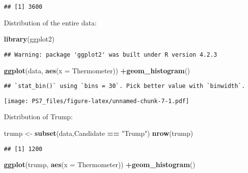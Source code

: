 \documentclass[
]{article}
\newenvironment{Shaded}{\begin{snugshade}}{\end{snugshade}}
\newcommand{\AttributeTok}[1]{\textcolor[rgb]{0.13,0.29,0.53}{#1}}
\newcommand{\FunctionTok}[1]{\textcolor[rgb]{0.13,0.29,0.53}{\textbf{#1}}}
\newcommand{\NormalTok}[1]{#1}
\newcommand{\OtherTok}[1]{\textcolor[rgb]{0.56,0.35,0.01}{#1}}
\newcommand{\SpecialCharTok}[1]{\textcolor[rgb]{0.81,0.36,0.00}{\textbf{#1}}}
\newcommand{\StringTok}[1]{\textcolor[rgb]{0.31,0.60,0.02}{#1}}
\begin{document}
\begin{verbatim}
## [1] 3600
\end{verbatim}

Distribution of the entire data:

\begin{Shaded}
\begin{Highlighting}[]
\FunctionTok{library}\NormalTok{(ggplot2)}
\end{Highlighting}
\end{Shaded}

\begin{verbatim}
## Warning: package 'ggplot2' was built under R version 4.2.3
\end{verbatim}

\begin{Shaded}
\begin{Highlighting}[]
\FunctionTok{ggplot}\NormalTok{(data, }\FunctionTok{aes}\NormalTok{(}\AttributeTok{x =}\NormalTok{ Thermometer)) }\SpecialCharTok{+}\FunctionTok{geom\_histogram}\NormalTok{()}
\end{Highlighting}
\end{Shaded}

\begin{verbatim}
## `stat_bin()` using `bins = 30`. Pick better value with `binwidth`.
\end{verbatim}

\texttt{[image: PS7\_files/figure-latex/unnamed-chunk-7-1.pdf]}

Distribution of Trump:

\begin{Shaded}
\begin{Highlighting}[]
\NormalTok{trump }\OtherTok{\textless{}{-}} \FunctionTok{subset}\NormalTok{(data,Candidate }\SpecialCharTok{==} \StringTok{"Trump"}\NormalTok{)}
\FunctionTok{nrow}\NormalTok{(trump)}
\end{Highlighting}
\end{Shaded}

\begin{verbatim}
## [1] 1200
\end{verbatim}

\begin{Shaded}
\begin{Highlighting}[]
\FunctionTok{ggplot}\NormalTok{(trump, }\FunctionTok{aes}\NormalTok{(}\AttributeTok{x =}\NormalTok{ Thermometer)) }\SpecialCharTok{+}\FunctionTok{geom\_histogram}\NormalTok{()}
\end{Highlighting}
\end{Shaded}
\end{document}
